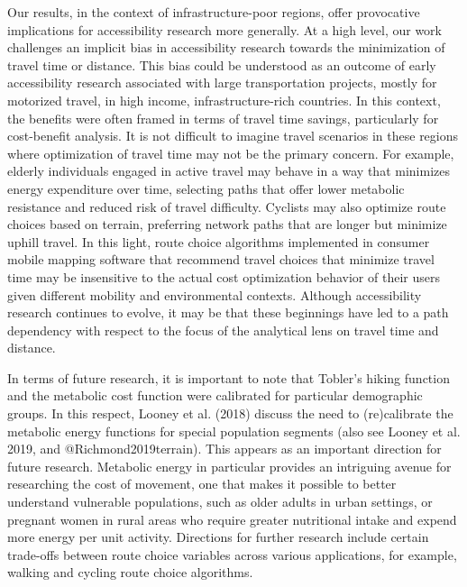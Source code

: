 \documentclass[]{elsarticle} %
\begin{document}
Our results, in the context of infrastructure-poor regions, offer
provocative implications for accessibility research more generally. At a
high level, our work challenges an implicit bias in accessibility
research towards the minimization of travel time or distance. This bias
could be understood as an outcome of early accessibility research
associated with large transportation projects, mostly for motorized
travel, in high income, infrastructure-rich countries. In this context,
the benefits were often framed in terms of travel time savings,
particularly for cost-benefit analysis. It is not difficult to imagine
travel scenarios in these regions where optimization of travel time may
not be the primary concern. For example, elderly individuals engaged in
active travel may behave in a way that minimizes energy expenditure over
time, selecting paths that offer lower metabolic resistance and reduced
risk of travel difficulty. Cyclists may also optimize route choices
based on terrain, preferring network paths that are longer but minimize
uphill travel. In this light, route choice algorithms implemented in
consumer mobile mapping software that recommend travel choices that
minimize travel time may be insensitive to the actual cost optimization
behavior of their users given different mobility and environmental
contexts. Although accessibility research continues to evolve, it may be
that these beginnings have led to a path dependency with respect to the
focus of the analytical lens on travel time and distance.

In terms of future research, it is important to note that Tobler's
hiking function and the metabolic cost function were calibrated for
particular demographic groups. In this respect, Looney et al. (2018)
discuss the need to (re)calibrate the metabolic energy functions for
special population segments (also see Looney et al. 2019, and
@Richmond2019terrain). This appears as an important direction for future
research. Metabolic energy in particular provides an intriguing avenue
for researching the cost of movement, one that makes it possible to
better understand vulnerable populations, such as older adults in urban
settings, or pregnant women in rural areas who require greater
nutritional intake and expend more energy per unit activity. Directions
for further research include certain trade-offs between route choice
variables across various applications, for example, walking and cycling
route choice algorithms.
\end{document}
